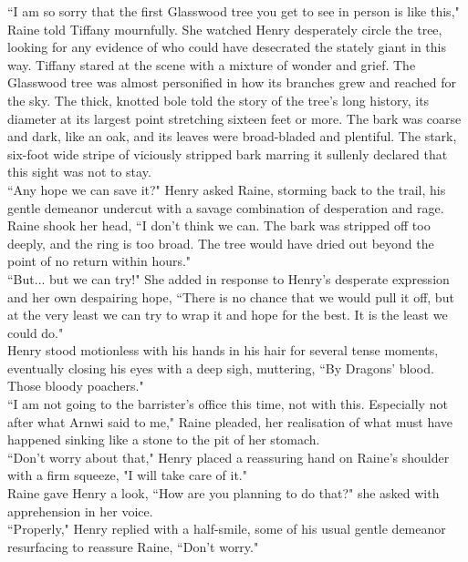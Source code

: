 ``I am so sorry that the first Glasswood tree you get to see in person is like this," Raine told Tiffany mournfully.
She watched Henry desperately circle the tree, looking for any evidence of who could have desecrated the stately giant in this way.
Tiffany stared at the scene with a mixture of wonder and grief.
The Glasswood tree was almost personified in how its branches grew and reached for the sky. 
The thick, knotted bole told the story of the tree's long history, its diameter at its largest point stretching sixteen feet or more.
The bark was coarse and dark, like an oak, and its leaves were broad-bladed and plentiful.
The stark, six-foot wide stripe of viciously stripped bark marring it sullenly declared that this sight was not to stay.\\

``Any hope we can save it?" Henry asked Raine, storming back to the trail, his gentle demeanor undercut with a savage combination of desperation and rage.\\
Raine shook her head, ``I don't think we can. The bark was stripped off too deeply, and the ring is too broad. The tree would have dried out beyond the point of no return within hours."\\
``But... but we can try!" She added in response to Henry's desperate expression and her own despairing hope, ``There is no chance that we would pull it off, but at the very least we can try to wrap it and hope for the best. It is the least we could do."\\

Henry stood motionless with his hands in his hair for several tense moments, eventually closing his eyes with a deep sigh, muttering, ``By Dragons' blood. Those bloody poachers."\\
``I am not going to the barrister's office this time, not with this. Especially not after what Arnwi said to me," Raine pleaded, her realisation of what must have happened sinking like a stone to the pit of her stomach.\\
``Don't worry about that," Henry placed a reassuring hand on Raine's shoulder with a firm squeeze, "I will take care of it."\\
Raine gave Henry a look, ``How are you planning to do that?" she asked with apprehension in her voice.\\
``Properly," Henry replied with a half-smile, some of his usual gentle demeanor resurfacing to reassure Raine, ``Don't worry."\\

